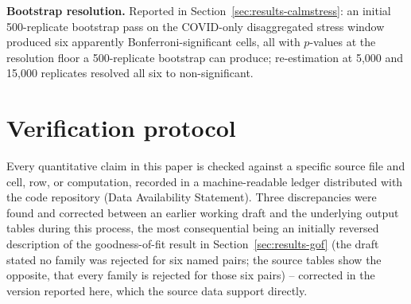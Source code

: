 \documentclass[final,3p,times,authoryear]{elsarticle}
\begin{document}
\textbf{Bootstrap resolution.} Reported in
Section~\ref{sec:results-calmstress}: an initial 500-replicate bootstrap
pass on the COVID-only disaggregated stress window produced six
apparently Bonferroni-significant cells, all with $p$-values at the
resolution floor a 500-replicate bootstrap can produce; re-estimation at
5,000 and 15,000 replicates resolved all six to non-significant.

\section{Verification protocol}
\label{app:ledger}

Every quantitative claim in this paper is checked against a specific
source file and cell, row, or computation, recorded in a machine-readable
ledger distributed with the code repository (Data Availability
Statement). Three discrepancies were found and corrected between an
earlier working draft and the underlying output tables during this
process, the most consequential being an initially reversed description
of the goodness-of-fit result in Section~\ref{sec:results-gof} (the
draft stated no family was rejected for six named pairs; the source
tables show the opposite, that every family is rejected for those six
pairs) -- corrected in the version reported here, which the source data
support directly.
\end{document}
